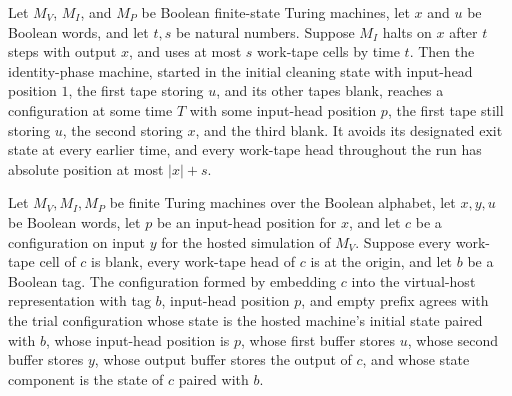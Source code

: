 \begin{theorem}
\label{Complexity.b2b_trial_capture}
\leanok
{}
Let $M_V$, $M_I$, and $M_P$ be Boolean finite-state Turing machines, let $x$ and $u$ be
Boolean words, and let $t,s$ be natural numbers. Suppose $M_I$ halts on $x$ after $t$
steps with output $x$, and uses at most $s$ work-tape cells by time $t$. Then the
identity-phase machine, started in the initial cleaning state with input-head position
$1$, the first tape storing $u$, and its other tapes blank, reaches a configuration at
some time $T$ with some input-head position $p$, the first tape still storing $u$, the
second storing $x$, and the third blank. It avoids its designated exit state at every
earlier time, and every work-tape head throughout the run has absolute position at most
$|x|+s$.
\end{theorem}

\begin{theorem}
\label{Complexity.b2b_call_shape}
\leanok
{}
Let $M_V,M_I,M_P$ be finite Turing machines over the Boolean alphabet, let $x,y,u$ be
Boolean words, let $p$ be an input-head position for $x$, and let $c$ be a configuration
on input $y$ for the hosted simulation of $M_V$. Suppose every work-tape cell of $c$ is
blank, every work-tape head of $c$ is at the origin, and let $b$ be a Boolean tag. The
configuration formed by embedding $c$ into the virtual-host representation with tag $b$,
input-head position $p$, and empty prefix agrees with the trial configuration whose
state is the hosted machine's initial state paired with $b$, whose input-head position
is $p$, whose first buffer stores $u$, whose second buffer stores $y$, whose output
buffer stores the output of $c$, and whose state component is the state of $c$ paired
with $b$.
\end{theorem}

